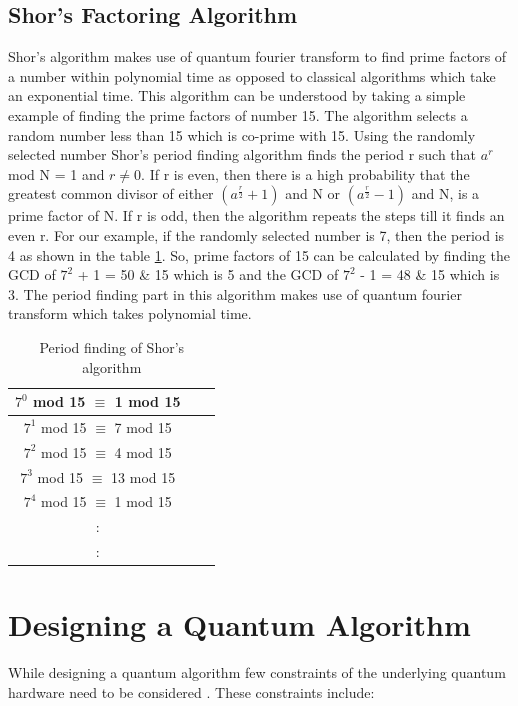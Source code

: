 \documentclass[english,a4paper,11pt,oneside,onecolumn]{book}
\begin{document}
\subsection{Shor's Factoring Algorithm}
\label{sec:shorAlgo}
Shor's algorithm \cite{shor_2019_algorithms} makes use of quantum fourier transform to find prime factors of a number within polynomial time as opposed to classical algorithms which take an exponential time. This algorithm can be understood by taking a simple example of finding the prime factors of number 15. The algorithm selects a random number less than 15 which is co-prime with 15. Using the randomly selected number Shor's period finding algorithm finds the period r such that \(a^r\) mod N = 1 and \(r \neq 0\). If r is even, then there is a high probability that the greatest common divisor of either \(\left(a^\frac{r}{2} + 1\right)\) and N or \(\left(a^\frac{r}{2} - 1\right)\) and N, is a prime factor of N. If r is odd, then the algorithm repeats the steps till it finds an even r. For our example, if the randomly selected number is 7, then the period is 4 as shown in the table \ref{tab:shorPeriodFinding}. So, prime factors of 15 can be calculated by finding the GCD of \(7^2\) + 1 = 50 \& 15 which is 5 and the GCD of \(7^2\) - 1 = 48 \& 15 which is 3. The period finding part in this algorithm makes use of quantum fourier transform which takes polynomial time. 

\begin{table}[!h]
\begin{center}
\begin{tabular}{|c|c|c|}
\hline
\(7^0\) mod 15 $\equiv$ 1 mod 15\\
\hline
\(7^1\) mod 15 $\equiv$ 7 mod 15\\
\hline
\(7^2\) mod 15 $\equiv$ 4 mod 15\\
\hline
\(7^3\) mod 15 $\equiv$ 13 mod 15\\
\hline
\(7^4\) mod 15 $\equiv$ 1 mod 15\\
\hline
:\\
:\\
\hline
\end{tabular}
\end{center}
\caption{Period finding of Shor's algorithm} 
\label{tab:shorPeriodFinding}
\end{table}

\section{Designing a Quantum Algorithm}
\label{algoDesign}
While designing a quantum algorithm few constraints of the underlying quantum hardware need to be considered \cite{j_2020_quantum}. These constraints include:
\end{document}
